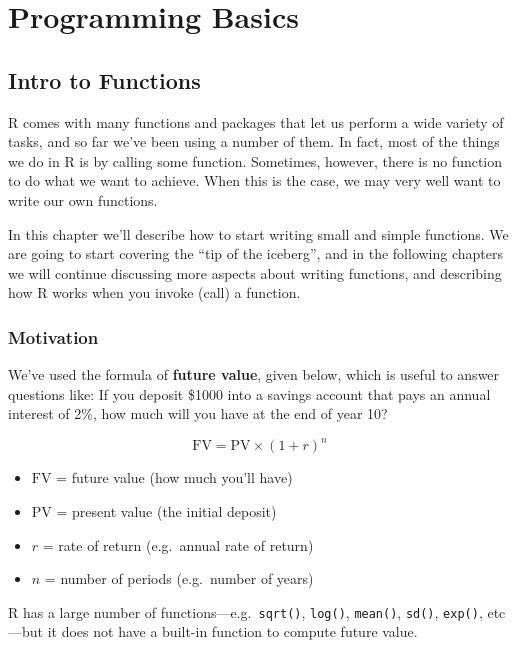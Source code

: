 \documentclass[
]{book}
\providecommand{\tightlist}{%
  \setlength{\itemsep}{0pt}\setlength{\parskip}{0pt}}
\begin{document}
\hypertarget{part-programming-basics}{%
\part{Programming Basics}\label{part-programming-basics}}

\hypertarget{functions1}{%
\chapter{Intro to Functions}\label{functions1}}

R comes with many functions and packages that let us perform a wide variety
of tasks, and so far we've been using a number of them. In fact, most of the
things we do in R is by calling some function. Sometimes, however, there is no
function to do what we want to achieve. When this is the case, we may very
well want to write our own functions.

In this chapter we'll describe how to start writing small and simple functions.
We are going to start covering the ``tip of the iceberg'', and in the following
chapters we will continue discussing more aspects about writing functions, and
describing how R works when you invoke (call) a function.

\hypertarget{motivation-3}{%
\section{Motivation}\label{motivation-3}}

We've used the formula of \textbf{future value}, given below, which is useful to
answer questions like: If you deposit \$1000 into a savings account that pays
an annual interest of 2\%, how much will you have at the end of year 10?

\[
\text{FV} = \text{PV} \times (1 + r)^n
\]

\begin{itemize}
\tightlist
\item
  \(\text{FV}\) = future value (how much you'll have)
\item
  \(\text{PV}\) = present value (the initial deposit)
\item
  \(r\) = rate of return (e.g.~annual rate of return)
\item
  \(n\) = number of periods (e.g.~number of years)
\end{itemize}

R has a large number of functions---e.g.~\texttt{sqrt()}, \texttt{log()}, \texttt{mean()},
\texttt{sd()}, \texttt{exp()}, etc---but it does not have a built-in function to compute
future value.
\end{document}
